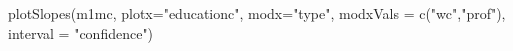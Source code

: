 \begin{Schunk}
\begin{Sinput}
 plotSlopes(m1mc, plotx="educationc", modx="type", modxVals = c("wc","prof"), interval = "confidence")
\end{Sinput}
\end{Schunk}
